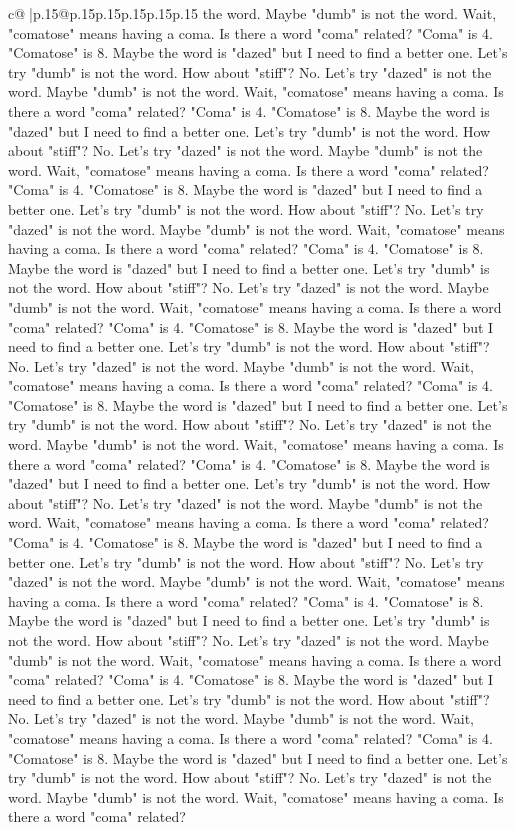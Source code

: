 \documentclass{article}
\begin{document}
{\begin{supertabular}{c@{$\;$}|p{.15\linewidth}@{}p{.15\linewidth}p{.15\linewidth}p{.15\linewidth}p{.15\linewidth}p{.15\linewidth}}
{{{the word. Maybe "dumb" is not the word. Wait, "comatose" means having a coma. Is there a word "coma" related? "Coma" is 4. "Comatose" is 8. Maybe the word is "dazed" but I need to find a better one. Let's try "dumb" is not the word. How about "stiff"? No. Let's try "dazed" is not the word. Maybe "dumb" is not the word. Wait, "comatose" means having a coma. Is there a word "coma" related? "Coma" is 4. "Comatose" is 8. Maybe the word is "dazed" but I need to find a better one. Let's try "dumb" is not the word. How about "stiff"? No. Let's try "dazed" is not the word. Maybe "dumb" is not the word. Wait, "comatose" means having a coma. Is there a word "coma" related? "Coma" is 4. "Comatose" is 8. Maybe the word is "dazed" but I need to find a better one. Let's try "dumb" is not the word. How about "stiff"? No. Let's try "dazed" is not the word. Maybe "dumb" is not the word. Wait, "comatose" means having a coma. Is there a word "coma" related? "Coma" is 4. "Comatose" is 8. Maybe the word is "dazed" but I need to find a better one. Let's try "dumb" is not the word. How about "stiff"? No. Let's try "dazed" is not the word. Maybe "dumb" is not the word. Wait, "comatose" means having a coma. Is there a word "coma" related? "Coma" is 4. "Comatose" is 8. Maybe the word is "dazed" but I need to find a better one. Let's try "dumb" is not the word. How about "stiff"? No. Let's try "dazed" is not the word. Maybe "dumb" is not the word. Wait, "comatose" means having a coma. Is there a word "coma" related? "Coma" is 4. "Comatose" is 8. Maybe the word is "dazed" but I need to find a better one. Let's try "dumb" is not the word. How about "stiff"? No. Let's try "dazed" is not the word. Maybe "dumb" is not the word. Wait, "comatose" means having a coma. Is there a word "coma" related? "Coma" is 4. "Comatose" is 8. Maybe the word is "dazed" but I need to find a better one. Let's try "dumb" is not the word. How about "stiff"? No. Let's try "dazed" is not the word. Maybe "dumb" is not the word. Wait, "comatose" means having a coma. Is there a word "coma" related? "Coma" is 4. "Comatose" is 8. Maybe the word is "dazed" but I need to find a better one. Let's try "dumb" is not the word. How about "stiff"? No. Let's try "dazed" is not the word. Maybe "dumb" is not the word. Wait, "comatose" means having a coma. Is there a word "coma" related? "Coma" is 4. "Comatose" is 8. Maybe the word is "dazed" but I need to find a better one. Let's try "dumb" is not the word. How about "stiff"? No. Let's try "dazed" is not the word. Maybe "dumb" is not the word. Wait, "comatose" means having a coma. Is there a word "coma" related? "Coma" is 4. "Comatose" is 8. Maybe the word is "dazed" but I need to find a better one. Let's try "dumb" is not the word. How about "stiff"? No. Let's try "dazed" is not the word. Maybe "dumb" is not the word. Wait, "comatose" means having a coma. Is there a word "coma" related? "Coma" is 4. "Comatose" is 8. Maybe the word is "dazed" but I need to find a better one. Let's try "dumb" is not the word. How about "stiff"? No. Let's try "dazed" is not the word. Maybe "dumb" is not the word. Wait, "comatose" means having a coma. Is there a word "coma" related? }}}
\end{supertabular}}
\end{document}
